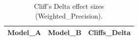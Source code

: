 \begin{table}[t]
\centering
\begin{tabular}{lll}
\toprule
Model_A & Model_B & Cliffs_Delta \\
\midrule
\bottomrule
\end{tabular}
\caption{Cliff's Delta effect sizes (Weighted_Precision).}
\label{tab:cliffs_Weighted_Precision}
\end{table}